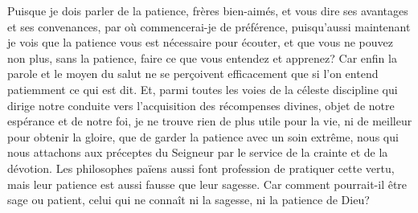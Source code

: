 Puisque je dois parler de la patience, frères bien-aimés,
	et vous dire ses avantages et ses convenances,
	par où commencerai-je de préférence,
	puisqu’aussi maintenant je vois que la patience
		vous est nécessaire pour écouter,
	et que vous ne pouvez non plus, sans la patience,
	faire ce que vous entendez et apprenez?
Car enfin la parole et le moyen du salut ne se perçoivent efficacement
	que si l’on entend patiemment ce qui est dit.
Et, parmi toutes les voies de la céleste discipline
	qui dirige notre conduite vers l’acquisition des récompenses divines,
	objet de notre espérance et de notre foi,
	je ne trouve rien de plus utile pour la vie,
	ni de meilleur pour obtenir la gloire,
	que de garder la patience avec un soin extrême,
	nous qui nous attachons aux préceptes du Seigneur
		par le service de la crainte et de la dévotion.
Les philosophes païens aussi font profession de pratiquer cette vertu,
	mais leur patience est aussi fausse que leur sagesse.
Car comment pourrait-il être sage ou patient,
	celui qui ne connaît ni la sagesse, ni la patience de Dieu?
